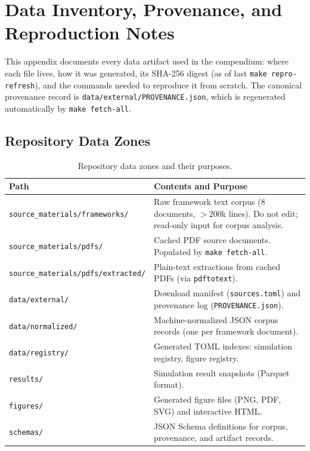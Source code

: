 
\chapter{Data Inventory, Provenance, and Reproduction Notes}
\label{app:data_inventory}

This appendix documents every data artifact used in the compendium:
where each file lives, how it was generated, its SHA-256 digest (as of
last \texttt{make repro-refresh}), and the commands needed to reproduce it
from scratch.  The canonical provenance record is
\texttt{data/external/PROVENANCE.json}, which is regenerated automatically
by \texttt{make fetch-all}.

\section{Repository Data Zones}
\label{app:data_zones}

\begin{table}[ht]
\centering
\begin{tabular}{p{5.5cm}p{8cm}}
\toprule
\textbf{Path} & \textbf{Contents and Purpose} \\
\midrule
\texttt{source\_materials/frameworks/} &
    Raw framework text corpus (8 documents, $> 200$k lines).
    Do not edit; read-only input for corpus analysis. \\
\texttt{source\_materials/pdfs/} &
    Cached PDF source documents.
    Populated by \texttt{make fetch-all}. \\
\texttt{source\_materials/pdfs/extracted/} &
    Plain-text extractions from cached PDFs (via \texttt{pdftotext}). \\
\texttt{data/external/} &
    Download manifest (\texttt{sources.toml}) and provenance log
    (\texttt{PROVENANCE.json}). \\
\texttt{data/normalized/} &
    Machine-normalized JSON corpus records (one per framework document). \\
\texttt{data/registry/} &
    Generated TOML indexes: simulation registry, figure registry. \\
\texttt{results/} &
    Simulation result snapshots (Parquet format). \\
\texttt{figures/} &
    Generated figure files (PNG, PDF, SVG) and interactive HTML. \\
\texttt{schemas/} &
    JSON Schema definitions for corpus, provenance, and artifact records. \\
\bottomrule
\end{tabular}
\caption{Repository data zones and their purposes.}
\label{tab:data_zones}
\end{table}

